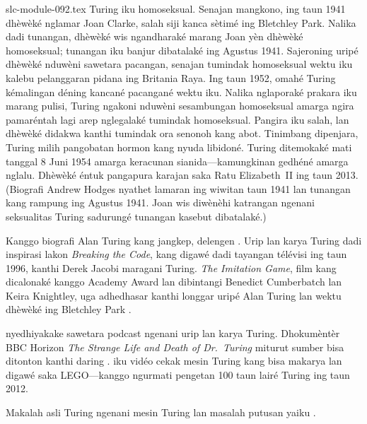 \begin{filecontents*}[overwrite]{slc-module-092.tex}
Turing iku homoseksual.
Senajan mangkono, ing
taun 1941 dhèwèké
nglamar Joan Clarke,
salah siji kanca
sètimé ing Bletchley
Park. Nalika dadi tunangan,
dhèwèké wis ngandharaké marang
Joan yèn dhèwèké homoseksual;
tunangan iku banjur dibatalaké
ing Agustus 1941. Sajeroning
uripé dhèwèké
nduwèni sawetara
pacangan, senajan
tumindak homoseksual
wektu iku kalebu
pelanggaran pidana
ing Britania Raya.
Ing taun 1952,
omahé Turing
kémalingan déning
kancané pacangané
wektu iku. Nalika
nglaporaké prakara
iku marang pulisi,
Turing ngakoni
nduwèni sesambungan
homoseksual amarga
ngira pamaréntah
lagi arep nglegalaké
tumindak homoseksual.
Pangira iku salah,
lan dhèwèké didakwa
kanthi tumindak
ora senonoh kang
abot. Tinimbang
dipenjara, Turing
milih pangobatan
hormon kang nyuda
libidoné. Turing
ditemokaké mati
tanggal 8 Juni 1954
amarga keracunan
sianida---kamungkinan
gedhéné amarga nglalu.
Dhèwèké éntuk
pangapura karajan
saka Ratu
Elizabeth~II
ing taun 2013.
(Biografi Andrew Hodges nyathet lamaran ing wiwitan taun 1941 lan tunangan kang rampung ing Agustus 1941. Joan wis diwènèhi katrangan ngenani seksualitas Turing sadurungé tunangan kasebut dibatalaké.)

\begin{reading}
Kanggo biografi Alan Turing
kang jangkep, delengen
\citet{Hodges2014}.
Urip lan karya Turing
dadi inspirasi lakon
\emph{Breaking the Code},
kang digawé dadi
tayangan télévisi
ing taun 1996,
kanthi Derek Jacobi
maragani Turing.
\emph{The Imitation Game},
film kang dicalonaké
kanggo Academy Award
lan dibintangi
Benedict Cumberbatch
lan Keira Knightley,
uga adhedhasar
kanthi longgar
uripé Alan Turing
lan wektu dhèwèké
ing Bletchley Park
\citep{Imitation2014}.

\citet{Radiolab2012}
nyedhiyakake
sawetara podcast
ngenani urip
lan karya Turing.
Dhokumèntèr
BBC Horizon
\emph{The Strange Life and Death of
  Dr.~Turing}
miturut sumber bisa ditonton
kanthi daring
\citep{Sykes1992}.
\citep{Theelen2012}
iku vidéo cekak
mesin Turing
kang bisa makarya
lan digawé saka
LEGO---kanggo
ngurmati
pengetan 100
taun lairé
Turing ing
taun 2012.

Makalah asli
Turing ngenani
mesin Turing
lan masalah
putusan yaiku
\citet{Turing1937}.
\end{reading}


\end{filecontents*}

